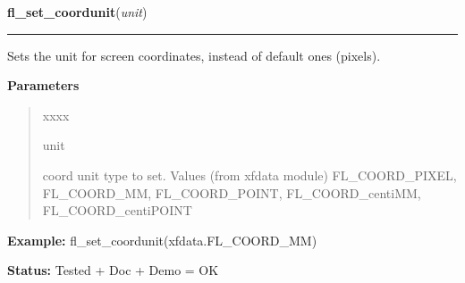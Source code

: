 \hspace{.8\funcindent}\begin{boxedminipage}{\funcwidth}

    \raggedright \textbf{fl\_set\_coordunit}(\textit{unit})

    \vspace{-1.5ex}

    \rule{\textwidth}{0.5\fboxrule}
\setlength{\parskip}{2ex}
    Sets the unit for screen coordinates, instead of default ones (pixels).

\setlength{\parskip}{1ex}
      \textbf{Parameters}
      \vspace{-1ex}

      \begin{quote}
        \begin{Ventry}{xxxx}

          \item[unit]

          coord unit type to set. Values (from xfdata module) 
          FL\_COORD\_PIXEL, FL\_COORD\_MM, FL\_COORD\_POINT, 
          FL\_COORD\_centiMM, FL\_COORD\_centiPOINT

        \end{Ventry}

      \end{quote}

\textbf{Example:} fl\_set\_coordunit(xfdata.FL\_COORD\_MM)



\textbf{Status:} Tested + Doc + Demo = OK



    \end{boxedminipage}

    \label{xformslib:flbasic:fl_set_border_width}

    \vspace{0.5ex}


